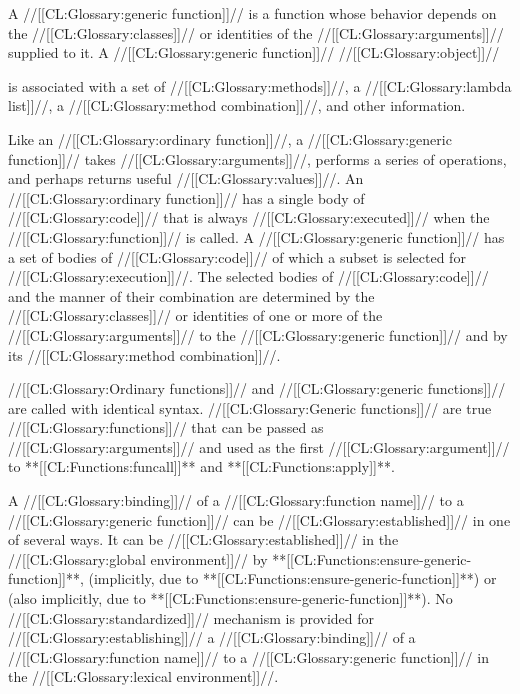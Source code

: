 

 

A //[[CL:Glossary:generic function]]// is a function whose behavior depends on the //[[CL:Glossary:classes]]// or identities of the //[[CL:Glossary:arguments]]// supplied to it. A //[[CL:Glossary:generic function]]// //[[CL:Glossary:object]]// 

is associated with 
     a set of //[[CL:Glossary:methods]]//,
     a //[[CL:Glossary:lambda list]]//,
     a //[[CL:Glossary:method combination]]//, 
 and other information.

Like an //[[CL:Glossary:ordinary function]]//, a //[[CL:Glossary:generic function]]// takes //[[CL:Glossary:arguments]]//, performs a series of operations, and perhaps returns useful //[[CL:Glossary:values]]//. An //[[CL:Glossary:ordinary function]]// has a single body of //[[CL:Glossary:code]]// that is always //[[CL:Glossary:executed]]// when the //[[CL:Glossary:function]]// is called.  A //[[CL:Glossary:generic function]]// has a set of bodies of //[[CL:Glossary:code]]// of which a subset is selected for //[[CL:Glossary:execution]]//. The selected bodies of //[[CL:Glossary:code]]// and the manner of their combination are determined by the //[[CL:Glossary:classes]]// or identities of one or more of the //[[CL:Glossary:arguments]]// to the //[[CL:Glossary:generic function]]// and by its //[[CL:Glossary:method combination]]//.

//[[CL:Glossary:Ordinary functions]]// and //[[CL:Glossary:generic functions]]// are called with identical syntax.
  //[[CL:Glossary:Generic functions]]// are true //[[CL:Glossary:functions]]// that can be passed as //[[CL:Glossary:arguments]]// and used as the first //[[CL:Glossary:argument]]// to **[[CL:Functions:funcall]]** and **[[CL:Functions:apply]]**.

A //[[CL:Glossary:binding]]// of a //[[CL:Glossary:function name]]// to a //[[CL:Glossary:generic function]]// can be //[[CL:Glossary:established]]// in one of several ways.  It can be //[[CL:Glossary:established]]// in the //[[CL:Glossary:global environment]]// by 
 **[[CL:Functions:ensure-generic-function]]**,
  (implicitly, due to **[[CL:Functions:ensure-generic-function]]**) or
  (also implicitly, due to **[[CL:Functions:ensure-generic-function]]**).  No //[[CL:Glossary:standardized]]// mechanism is provided for //[[CL:Glossary:establishing]]// a //[[CL:Glossary:binding]]// of a //[[CL:Glossary:function name]]// to a //[[CL:Glossary:generic function]]// in the //[[CL:Glossary:lexical environment]]//.

